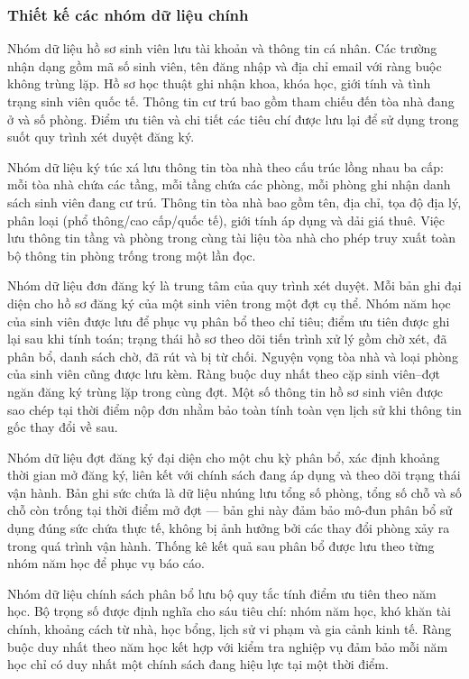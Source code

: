 \documentclass[../DoAn.tex]{subfiles}
\begin{document}
\subsubsection*{Thiết kế các nhóm dữ liệu chính}

Nhóm dữ liệu hồ sơ sinh viên lưu tài khoản và thông tin cá nhân. Các trường
nhận dạng gồm mã số sinh viên, tên đăng nhập và địa chỉ email với ràng buộc
không trùng lặp. Hồ sơ học thuật ghi nhận khoa, khóa học, giới tính và tình
trạng sinh viên quốc tế. Thông tin cư trú bao gồm tham chiếu đến tòa nhà đang
ở và số phòng. Điểm ưu tiên và chi tiết các tiêu chí được lưu lại để sử dụng
trong suốt quy trình xét duyệt đăng ký.

Nhóm dữ liệu ký túc xá lưu thông tin tòa nhà theo cấu trúc lồng nhau ba cấp:
mỗi tòa nhà chứa các tầng, mỗi tầng chứa các phòng, mỗi phòng ghi nhận danh
sách sinh viên đang cư trú. Thông tin tòa nhà bao gồm tên, địa chỉ, tọa độ
địa lý, phân loại (phổ thông/cao cấp/quốc tế), giới tính áp dụng và dải giá
thuê. Việc lưu thông tin tầng và phòng trong cùng tài liệu tòa nhà cho phép
truy xuất toàn bộ thông tin phòng trống trong một lần đọc.

Nhóm dữ liệu đơn đăng ký là trung tâm của quy trình xét duyệt. Mỗi bản ghi
đại diện cho hồ sơ đăng ký của một sinh viên trong một đợt cụ thể. Nhóm năm
học của sinh viên được lưu để phục vụ phân bổ theo chỉ tiêu; điểm ưu tiên
được ghi lại sau khi tính toán; trạng thái hồ sơ theo dõi tiến trình xử lý
gồm chờ xét, đã phân bổ, danh sách chờ, đã rút và bị từ chối. Nguyện vọng
tòa nhà và loại phòng của sinh viên cũng được lưu kèm. Ràng buộc duy nhất
theo cặp sinh viên--đợt ngăn đăng ký trùng lặp trong cùng đợt. Một số thông
tin hồ sơ sinh viên được sao chép tại thời điểm nộp đơn nhằm bảo toàn tính
toàn vẹn lịch sử khi thông tin gốc thay đổi về sau.

Nhóm dữ liệu đợt đăng ký đại diện cho một chu kỳ phân bổ, xác định khoảng
thời gian mở đăng ký, liên kết với chính sách đang áp dụng và theo dõi trạng
thái vận hành. Bản ghi sức chứa là dữ liệu nhúng lưu tổng số phòng, tổng số
chỗ và số chỗ còn trống tại thời điểm mở đợt --- bản ghi này đảm bảo mô-đun
phân bổ sử dụng đúng sức chứa thực tế, không bị ảnh hưởng bởi các thay đổi
phòng xảy ra trong quá trình vận hành. Thống kê kết quả sau phân bổ được lưu
theo từng nhóm năm học để phục vụ báo cáo.

Nhóm dữ liệu chính sách phân bổ lưu bộ quy tắc tính điểm ưu tiên theo năm
học. Bộ trọng số được định nghĩa cho sáu tiêu chí: nhóm năm học, khó khăn
tài chính, khoảng cách từ nhà, học bổng, lịch sử vi phạm và gia cảnh kinh tế.
Ràng buộc duy nhất theo năm học kết hợp với kiểm tra nghiệp vụ đảm bảo mỗi
năm học chỉ có duy nhất một chính sách đang hiệu lực tại một thời điểm.
\end{document}
